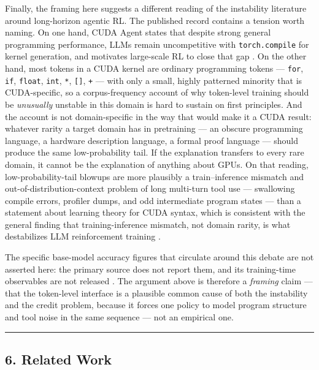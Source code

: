\documentclass[
  11pt,
]{article}
\begin{document}
Finally, the framing here suggests a different reading of the instability literature around long-horizon agentic RL. The published record contains a tension worth naming. On one hand, CUDA Agent states that despite strong general programming performance, LLMs remain uncompetitive with \texttt{torch.compile} for kernel generation, and motivates large-scale RL to close that gap \cite{cuda1}. On the other hand, most tokens in a CUDA kernel are ordinary programming tokens --- \texttt{for}, \texttt{if}, \texttt{float}, \texttt{int}, \texttt{*}, \texttt{{[}{]}}, \texttt{+} --- with only a small, highly patterned minority that is CUDA-specific, so a corpus-frequency account of why token-level training should be \emph{unusually} unstable in this domain is hard to sustain on first principles. And the account is not domain-specific in the way that would make it a CUDA result: whatever rarity a target domain has in pretraining --- an obscure programming language, a hardware description language, a formal proof language --- should produce the same low-probability tail. If the explanation transfers to every rare domain, it cannot be the explanation of anything about GPUs. On that reading, low-probability-tail blowups are more plausibly a train--inference mismatch and out-of-distribution-context problem of long multi-turn tool use --- swallowing compile errors, profiler dumps, and odd intermediate program states --- than a statement about learning theory for CUDA syntax, which is consistent with the general finding that training-inference mismatch, not domain rarity, is what destabilizes LLM reinforcement training \cite{rethinking26,score27}.

The specific base-model accuracy figures that circulate around this debate are not asserted here: the primary source does not report them, and its training-time observables are not released \cite{cuda1}. The argument above is therefore a \emph{framing} claim --- that the token-level interface is a plausible common cause of both the instability and the credit problem, because it forces one policy to model program structure and tool noise in the same sequence --- not an empirical one.

\begin{center}\rule{0.5\linewidth}{0.5pt}\end{center}

\hypertarget{related-work}{%
\subsection{6. Related Work}\label{related-work}}
\end{document}

